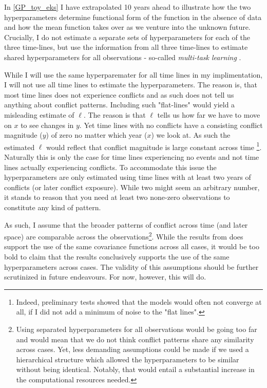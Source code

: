 \documentclass[a4paper]{article}
\begin{document}
In \autoref{GP_toy_eks} I have extrapolated 10 years ahead to illustrate how the two hyperparameters determine functional form of the function in the absence of data and how the mean function takes over as we venture into the unknown future. Crucially, I do not estimate a separate sets of hyperparameters for each of the three time-lines, but use the information from all three time-lines to estimate shared hyperparameters for all observations - so-called \emph{multi-task learning} \cite[115]{williams2006gaussian}.\par

While I will use the same hyperparemater for all time lines in my implimentation, I will not use all time lines to estimate the hyperparameters. The reason is, that most time lines does not experience conflicts and as such does not tell us anything about conflict patterns. Including such "flat-lines" would yield a misleading estimate of $\ell$. The reason is that $\ell$ tells us how far we have to move on $x$ to see changes in $y$. Yet time lines with no conflicts have a consisting conflict magnitude ($y$) of zero no matter which year ($x$) we look at. As such the estimated $\ell$ would reflect that conflict magnitude is large constant across time \footnote{Indeed, preliminary tests showed that the models would often not converge at all, if I did not add a minimum of noise to the "flat lines".}. Naturally this is only the case for time lines experiencing no events and not time lines actually experiencing conflicts. To accommodate this issue the hyperparameters are only estimated using time lines with at least two years of conflicts (or later conflict exposure). While two might seem an arbitrary number, it stands to reason that you need at least two none-zero observations to constitute any kind of pattern.\par

As such, I assume that the broader patterns of conflict across time (and later space) are comparable across the observations\footnote{Using separated hyperparameters for all observations would be going too far and would mean that we do not think conflict patterns share any similarity across cases. Yet, less demanding assumptions could be made if we used a hierarchical structure which allowed the hyperparameters to be similar without being identical. Notably, that would entail a substantial increase in the computational resources needed.}. While the results from \cite{schutte2011diffusion} does support the use of the same covariance functions across all cases, it would be too bold to claim that the results conclusively supports the use of the same hyperparameters across cases. The validity of this assumptions should be further scrutinized in future endeavours. For now, however, this will do.\par
\end{document}

